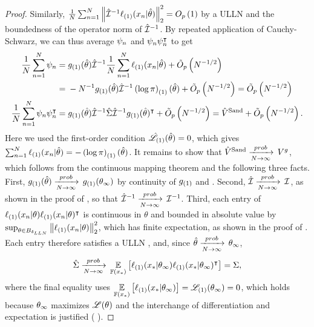 \begin{proof}
Similarly, $\frac{1}{N}\sum_{n=1}^N \left\Vert \hat{\mathcal{I}}^{-1} \ell_{(1)}(x_n \vert \hat\theta)\right\Vert_2^2 =
O_p\left(1\right)$ by a ULLN and the boundedness of the operator norm of $\hat{\mathcal{I}}^{-1}$.
By repeated application of Cauchy-Schwarz, we can thus average $\psi_n$ and
$\psi_n \psi_n^\intercal$ to get
%
\begin{align*}
%
\meann \infl_n ={}&
    \ggrad{1}(\thetahat) \infohat^{-1} \meann \ellgrad{1}(\x_n \vert \thetahat) +
    \ordlogp{N^{-1/2}}
    \\={}&
    -N^{-1} \ggrad{1}(\thetahat) \infohat^{-1} \logpriorgrad{1}(\thetahat) +
    \ordlogp{N^{-1/2}} = \ordlogp{N^{-1/2}} \\
\meann \infl_n \infl_n^\trans ={}&  \ggrad{1}(\thetahat) \infohat^{-1}
    \scorecovhat
    \infohat^{-1} \ggrad{1}(\thetahat)^\trans + \ordlogp{N^{-1/2}}
= \gcovmaphat + \ordlogp{N^{-1/2}}.
%
\end{align*}
%
Here we used the first-order condition $\hat{\mathscr{L}}_{(1)}(\hat\theta) = 0$, which gives
$\sum_{n=1}^N \ell_{(1)}(x_n \vert \hat\theta) = -\left(\log\pi\right)_{(1)}(\hat\theta)$.
It remains to show that $\hat{V}^{\mathrm{Sand}} \xrightarrow[N\rightarrow\infty]{prob}\, V^g$, which follows from the
continuous mapping theorem and the following three facts.  First,
$g_{(1)}(\hat\theta) \xrightarrow[N\rightarrow\infty]{prob}\, g_{(1)}(\theta_{\infty})$ by continuity of $g_{(1)}$
and .  Second, $\hat{\mathcal{I}} \xrightarrow[N\rightarrow\infty]{prob}\, \mathcal{I}$, as shown in
the proof of  , so that $\hat{\mathcal{I}}^{-1}
\xrightarrow[N\rightarrow\infty]{prob}\, \mathcal{I}^{-1}$.  Third, each entry of $\ell_{(1)}(x_n \vert \theta)
\ell_{(1)}(x_n \vert \theta)^\intercal$ is continuous in $\theta$ and bounded in
absolute value by $\sup_{\theta \in B_{\delta_{LLN}}}
\left\Vert \ell_{(1)}(x_n \vert \theta)\right\Vert_2^2$, which has finite expectation, as
shown in the proof of .  Each entry therefore satisfies a ULLN
\citep[Example 19.8]{van:2000:asymptotic}, and, since $\hat\theta \xrightarrow[N\rightarrow\infty]{prob}\,
\theta_{\infty}$,
%
\begin{align*}
%
\scorecovhat \plim
\expect{\fdist(\xn)}{
    \ellgrad{1}(\xn \vert \thetatrue) \ellgrad{1}(\xn \vert \thetatrue)^\trans
} = \scorecov,
%
\end{align*}
%
where the final equality uses $\underset{\mathbb{F}(x_{*})}{\mathbb{E}}\left[\ell_{(1)}(x_{*} \vert
\theta_{\infty})\right] = \mathscr{L}_{(1)}(\theta_{\infty}) = 0$, which holds because $\theta_{\infty}$
maximizes $\mathscr{L}(\theta)$ and the interchange of differentiation and expectation
is justified ( ).

\end{proof}


